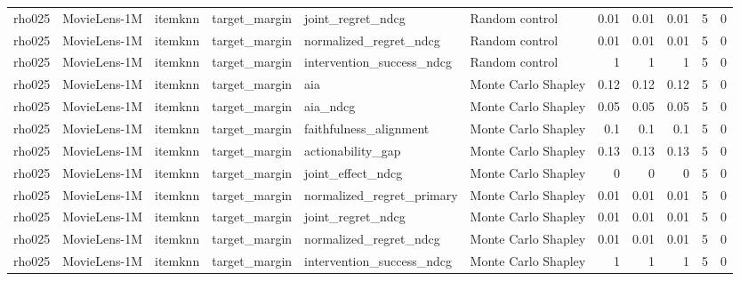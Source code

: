 \begin{table}[t]
{\begin{tabular}{llllllrrrrr}
rho025 & MovieLens-1M & itemknn & target\_margin & joint\_regret\_ndcg & Random control & 0.01 & 0.01 & 0.01 & 5 & 0 \\
rho025 & MovieLens-1M & itemknn & target\_margin & normalized\_regret\_ndcg & Random control & 0.01 & 0.01 & 0.01 & 5 & 0 \\
rho025 & MovieLens-1M & itemknn & target\_margin & intervention\_success\_ndcg & Random control & 1 & 1 & 1 & 5 & 0 \\
rho025 & MovieLens-1M & itemknn & target\_margin & aia & Monte Carlo Shapley & 0.12 & 0.12 & 0.12 & 5 & 0 \\
rho025 & MovieLens-1M & itemknn & target\_margin & aia\_ndcg & Monte Carlo Shapley & 0.05 & 0.05 & 0.05 & 5 & 0 \\
rho025 & MovieLens-1M & itemknn & target\_margin & faithfulness\_alignment & Monte Carlo Shapley & 0.1 & 0.1 & 0.1 & 5 & 0 \\
rho025 & MovieLens-1M & itemknn & target\_margin & actionability\_gap & Monte Carlo Shapley & 0.13 & 0.13 & 0.13 & 5 & 0 \\
rho025 & MovieLens-1M & itemknn & target\_margin & joint\_effect\_ndcg & Monte Carlo Shapley & 0 & 0 & 0 & 5 & 0 \\
rho025 & MovieLens-1M & itemknn & target\_margin & normalized\_regret\_primary & Monte Carlo Shapley & 0.01 & 0.01 & 0.01 & 5 & 0 \\
rho025 & MovieLens-1M & itemknn & target\_margin & joint\_regret\_ndcg & Monte Carlo Shapley & 0.01 & 0.01 & 0.01 & 5 & 0 \\
rho025 & MovieLens-1M & itemknn & target\_margin & normalized\_regret\_ndcg & Monte Carlo Shapley & 0.01 & 0.01 & 0.01 & 5 & 0 \\
rho025 & MovieLens-1M & itemknn & target\_margin & intervention\_success\_ndcg & Monte Carlo Shapley & 1 & 1 & 1 & 5 & 0 \\
\bottomrule
\end{tabular}
}
\end{table}
